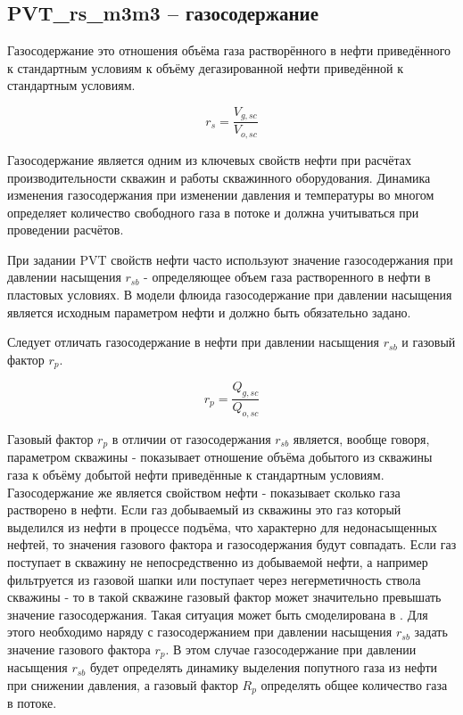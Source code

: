\subsection{PVT\_rs\_m3m3 – газосодержание}

Газосодержание это отношения объёма газа растворённого в нефти приведённого к стандартным условиям к объёму дегазированной нефти приведённой к стандартным условиям. 

$$r_s = \frac{V_{g,sc}}{V_{o,sc}}$$

Газосодержание является одним из ключевых свойств нефти при расчётах производительности скважин и работы скважинного оборудования. Динамика изменения газосодержания при изменении давления и температуры во многом определяет количество свободного газа в потоке и должна учитываться при проведении расчётов. 

При задании PVT свойств нефти часто используют значение газосодержания при давлении насыщения $r_{sb}$ - определяющее объем газа растворенного в нефти в пластовых условиях. В модели флюида \unf{} газосодержание при давлении насыщения является исходным параметром нефти и должно быть обязательно задано. 

Следует отличать газосодержание в нефти при давлении насыщения $r_{sb}$ и газовый фактор $r_p$.

$$r_p = \frac{Q_{g,sc}}{Q_{o,sc}}$$

Газовый фактор $r_{p}$  в отличии от газосодержания $r_{sb}$  является, вообще говоря, параметром скважины - показывает отношение объёма добытого из скважины газа  к объёму добытой нефти приведённые к стандартным условиям. Газосодержание же является свойством нефти - показывает сколько газа растворено в нефти. Если газ добываемый из скважины это газ который выделился из нефти в процессе подъёма, что характерно для недонасыщенных нефтей, то значения газового фактора и газосодержания будут совпадать. Если газ поступает в скважину не непосредственно из добываемой нефти, а например фильтруется из газовой шапки или поступает через негерметичность ствола скважины - то в такой скважине газовый фактор может значительно превышать значение газосодержания. Такая ситуация может быть смоделирована в \unf{}. Для этого необходимо наряду с газосодержанием при давлении насыщения $r_{sb}$ задать значение газового фактора $r_p$. В этом случае газосодержание при давлении насыщения $r_{sb}$  будет определять динамику выделения попутного газа из нефти при снижении давления, а газовый фактор $R_p$ определять общее количество газа в потоке. 

